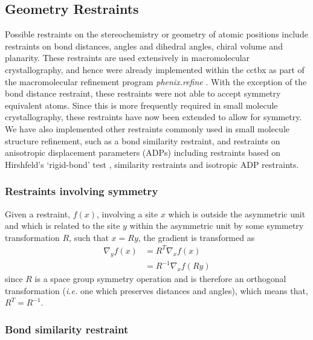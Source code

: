 \documentclass[pdf]{iucr}
\begin{document}
\subsection{Geometry Restraints}

Possible restraints on the stereochemistry or geometry of atomic positions include restraints on bond distances, angles and dihedral angles, chiral volume and planarity. These restraints are used extensively in macromolecular crystallography, and hence were already implemented within the cctbx as part of the macromolecular refinement program \emph{phenix.refine} \cite{Afonine:ba5180}. With the exception of the bond distance restraint, these restraints were not able to accept symmetry equivalent atoms. Since this is more frequently required in small molecule crystallography, these restraints have now been extended to allow for symmetry. We have also implemented other restraints commonly used in small molecule structure refinement, such as a bond similarity restraint, and restraints on anisotropic displacement parameters (ADPs) including restraints based on Hirshfeld's `rigid-bond' test \cite{Hirshfeld:a12865}, similarity restraints and isotropic ADP restraints.



\subsubsection{Restraints involving symmetry}

Given a restraint, $f(x)$, involving a site $x$ which is outside the asymmetric unit and which is related to the site $y$ within the asymmetric unit by some symmetry transformation $R$, such that $x=Ry$, the gradient is transformed as
\begin{align}
\nabla_y f\left(x \right)  &= R^T \nabla_x f\left(x\right) \nonumber\\
&= R^{-1} \nabla_x f\left(R y\right)
\label{eqn:}
\end{align}
since $R$ is a space group symmetry operation and is therefore an orthogonal transformation (\emph{i.e.} one which preserves distances and angles), which means that, $R^T = R^{-1}$.



\subsubsection{Bond similarity restraint}
\end{document}
